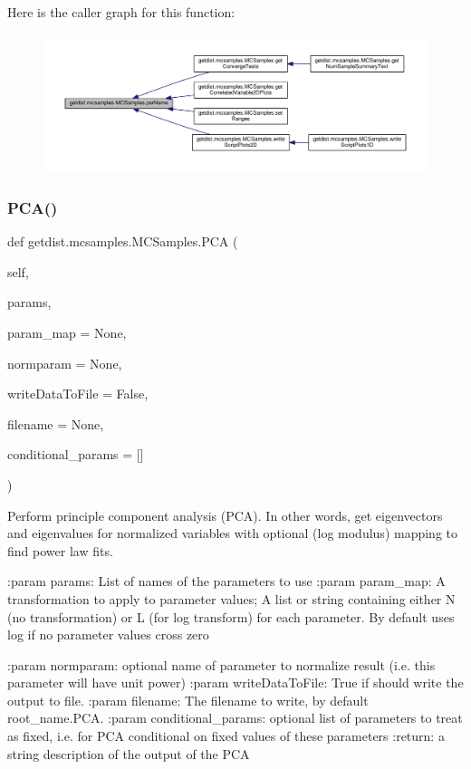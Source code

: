 Here is the caller graph for this function\+:
\nopagebreak
\begin{figure}[H]
\begin{center}
\leavevmode
\includegraphics[width=350pt]{classgetdist_1_1mcsamples_1_1MCSamples_a785dc1b8abd13411a1efa1e2f626fc26_icgraph}
\end{center}
\end{figure}
\mbox{\label{classgetdist_1_1mcsamples_1_1MCSamples_aa70441a6c22c1b03f47f56f08fd67cd1}} 
\subsubsection{\texorpdfstring{P\+C\+A()}{PCA()}}
{\footnotesize\ttfamily def getdist.\+mcsamples.\+M\+C\+Samples.\+P\+CA (\begin{DoxyParamCaption}\item[{}]{self,  }\item[{}]{params,  }\item[{}]{param\+\_\+map = {\ttfamily None},  }\item[{}]{normparam = {\ttfamily None},  }\item[{}]{write\+Data\+To\+File = {\ttfamily False},  }\item[{}]{filename = {\ttfamily None},  }\item[{}]{conditional\+\_\+params = {\ttfamily \mbox{[}\mbox{]}} }\end{DoxyParamCaption})}

\begin{DoxyVerb}Perform principle component analysis (PCA). In other words,
get eigenvectors and eigenvalues for normalized variables
with optional (log modulus) mapping to find power law fits.

:param params: List of names of the parameters to use
:param param_map: A transformation to apply to parameter values;
        A list or string containing either N (no transformation) or L (for log transform) for each parameter.
        By default uses log if no parameter values cross zero

:param normparam: optional name of parameter to normalize result (i.e. this parameter will have unit power)
:param writeDataToFile: True if should write the output to file.
:param filename: The filename to write, by default root_name.PCA.
:param conditional_params: optional list of parameters to treat as fixed, i.e. for PCA conditional on fixed values of these parameters
:return: a string description of the output of the PCA
\end{DoxyVerb}
 

